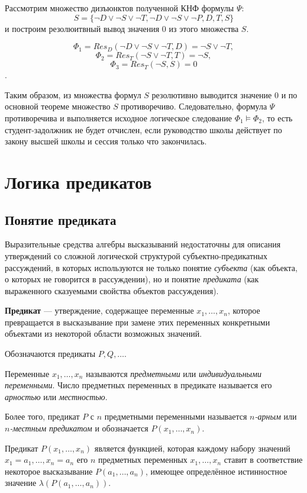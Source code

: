 Рассмотрим множество дизъюнктов полученной КНФ формулы $\Psi$:
$$S = \{\lnot D \lor \lnot S \lor \lnot T, \lnot D \lor \lnot S \lor \lnot P, D, T, S\}$$
и построим резолюитвный вывод значения 0 из этого множества $S$.

$$\Phi_1 = Res_D(\lnot D \lor \lnot S \lor \lnot T, D) = \lnot S \lor \lnot T,$$
$$\Phi_2 = Res_T(\lnot S \lor \lnot T, T) = \lnot S,$$
$$\Phi_3 = Res_T(\lnot S, S) = 0$$.

Таким образом, из множества формул $S$ резолютивно выводится значение 0 и по основной теореме множество $S$ противоречиво. Следовательно, формула $\Psi$ противоречива и выполняется исходное логическое следование $\Phi_1 \vDash \Phi_2$, то есть студент-задолжник не будет отчислен, если руководство школы действует по закону высшей школы и сессия только что закончилась.

\section{Логика предикатов}
\subsection{Понятие предиката}
Выразительные средства алгебры высказываний недостаточны для описания утверждений со сложной логической структурой субъектно-предикатных рассуждений, в которых используются не только понятие \textit{субъекта} (как объекта, о которых не говорится в рассуждении), но и понятие \textit{предиката} (как выраженного сказуемыми свойства объектов рассуждения).

\dftion \textbf{Предикат} --- утверждение, содержащее переменные $x_1,\dots,x_n$, которое превращается в высказывание при замене этих переменных конкретными объектами из некоторой области возможных значений.

Обозначаются предикаты $P, Q, \dots$.

Переменные $x_1, \dots, x_n$ называются \textit{предметными} или \textit{индивидуальными переменными}. Число предметных переменных в предикате называется его \textit{арностью} или \textit{местностью}.

Более того, предикат $P$ с $n$ предметными переменными называется \textit{$n$-арным} или \textit{$n$-местным предикатом} и обозначается $P(x_1, \dots, x_n)$.

Предикат $P(x_1,\dots,x_n)$ является функцией, которая каждому набору значений $x_1 = a_1, \dots, x_n = a_n$ его $n$ предметных переменных $x_1, \dots, x_n$ ставит в соответствие некоторое высказывание $P(a_1, \dots, a_n)$, имеющее определённое истинностное значение $\lambda(P(a_1, \dots, a_n))$.

